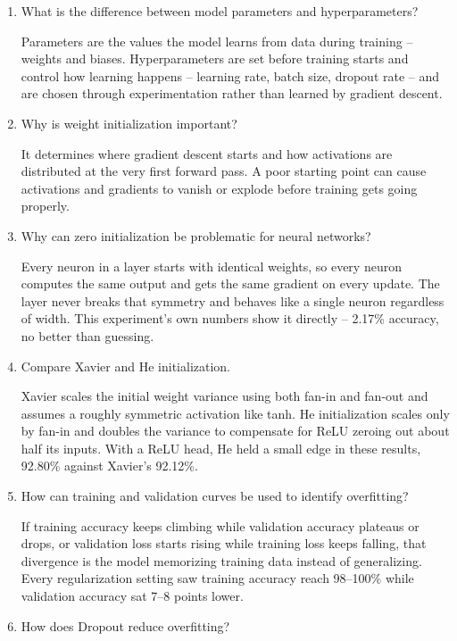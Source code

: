 \documentclass[10pt]{article}
\begin{document}
\begin{enumerate}

\item What is the difference between model parameters and hyperparameters?

Parameters are the values the model learns from data during training --
weights and biases. Hyperparameters are set before training starts and
control how learning happens -- learning rate, batch size, dropout rate --
and are chosen through experimentation rather than learned by gradient
descent.

\item Why is weight initialization important?

It determines where gradient descent starts and how activations are
distributed at the very first forward pass. A poor starting point can cause
activations and gradients to vanish or explode before training gets going
properly.

\item Why can zero initialization be problematic for neural networks?

Every neuron in a layer starts with identical weights, so every neuron
computes the same output and gets the same gradient on every update. The
layer never breaks that symmetry and behaves like a single neuron regardless
of width. This experiment's own numbers show it directly -- 2.17\% accuracy,
no better than guessing.

\item Compare Xavier and He initialization.

Xavier scales the initial weight variance using both fan-in and fan-out and
assumes a roughly symmetric activation like tanh. He initialization scales
only by fan-in and doubles the variance to compensate for ReLU zeroing out
about half its inputs. With a ReLU head, He held a small edge in these
results, 92.80\% against Xavier's 92.12\%.

\item How can training and validation curves be used to identify overfitting?

If training accuracy keeps climbing while validation accuracy plateaus or
drops, or validation loss starts rising while training loss keeps falling,
that divergence is the model memorizing training data instead of
generalizing. Every regularization setting saw training accuracy reach 98--100\%
while validation accuracy sat 7--8 points lower.

\item How does Dropout reduce overfitting?


\end{enumerate}
\end{document}
